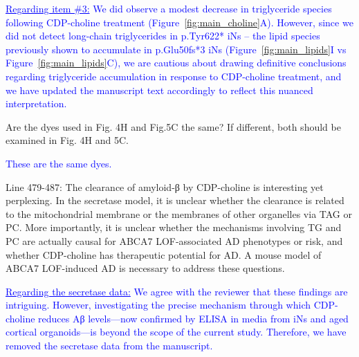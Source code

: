
\textcolor{blue}{\underline{Regarding item \#3:} We did  observe a modest decrease in triglyceride species following CDP-choline treatment (Figure~\ref{fig:main_choline}A). However, since we did not detect  long-chain triglycerides in p.Tyr622* iNs – the lipid species previously shown to accumulate in p.Glu50fs*3 iNs (Figure~\ref{fig:main_lipids}I vs Figure~\ref{fig:main_lipids}C), we are cautious about drawing definitive conclusions regarding triglyceride accumulation in response to CDP-choline treatment, and we have updated the manuscript text accordingly to reflect this nuanced interpretation.}

Are the dyes used in Fig. 4H and Fig.5C the same? If different, both should be examined in Fig. 4H and 5C.

\textcolor{blue}{These are the same dyes.}

Line 479-487: The clearance of amyloid-β by CDP-choline is interesting yet perplexing. In the secretase model, it is unclear whether the clearance is related to the mitochondrial membrane or the membranes of other organelles via TAG or PC. More importantly, it is unclear whether the mechanisms involving TG and PC are actually causal for ABCA7 LOF-associated AD phenotypes or risk, and whether CDP-choline has therapeutic potential for AD. A mouse model of ABCA7 LOF-induced AD is necessary to address these questions.

\textcolor{blue}{\underline{Regarding the secretase data:} We agree with the reviewer that these findings are intriguing. However, investigating the precise mechanism through which CDP-choline reduces Aβ levels—now confirmed by ELISA in media from iNs and aged cortical organoids—is beyond the scope of the current study. Therefore, we have removed the secretase data from the manuscript.}

